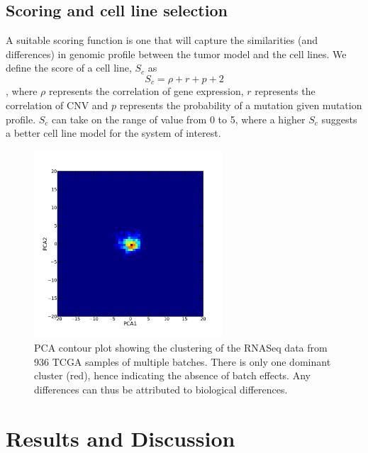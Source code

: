 \documentclass[a4paper,12pt]{article}
\begin{document}
\subsection{Scoring and cell line selection}
A suitable scoring function is one that will capture the similarities
(and differences) in genomic profile between the tumor model and the
cell lines. We define the score of a cell line, $\textit{S}$$_c$ as \begin{equation}
\textit{S}_c= \rho + \textit{r} + \textit{p} +2 \end{equation}, where $\rho$
represents the correlation of gene expression, $\textit{r}$ represents
the correlation of CNV and $\textit{p}$ represents the probability of
a mutation given mutation profile. $\textit{S}$$_c$ can take on the
range of value from 0 to 5, where a higher $\textit{S}$$_c$ suggests a
better cell line model for the system of interest.

\begin{figure}[t!]
\centering
\includegraphics[width=7cm]{PCAplot.png}
\caption[PCA plot of PC1 and PC2 on TCGA RNASeq data]{PCA contour plot
showing the clustering of the RNASeq data from 936 TCGA samples of
multiple batches. There is only one dominant cluster (red), hence
indicating the absence of batch effects. Any differences can thus be
attributed to biological differences.}
\label{pca}
\end{figure}

\section{Results and Discussion}
\end{document}
